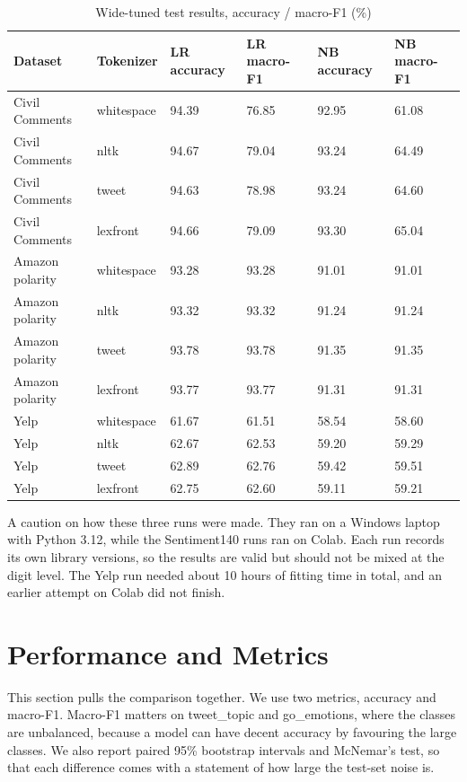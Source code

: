\documentclass[journal,a4paper]{IEEEtran}
\begin{document}
\begin{table}[!tb]
\caption{Wide-tuned test results, accuracy / macro-F1 (\%)}\label{tab:12}
\centering
\scriptsize
\setlength{\tabcolsep}{3pt}
\begin{tabular}{llllll}
\toprule
\textbf{Dataset} & \textbf{Tokenizer} & \textbf{LR accuracy} & \textbf{LR macro-F1} & \textbf{NB accuracy} & \textbf{NB macro-F1} \\
\midrule
Civil Comments & whitespace & 94.39 & 76.85 & 92.95 & 61.08 \\
Civil Comments & nltk & 94.67 & 79.04 & 93.24 & 64.49 \\
Civil Comments & tweet & 94.63 & 78.98 & 93.24 & 64.60 \\
Civil Comments & lexfront & 94.66 & 79.09 & 93.30 & 65.04 \\
Amazon polarity & whitespace & 93.28 & 93.28 & 91.01 & 91.01 \\
Amazon polarity & nltk & 93.32 & 93.32 & 91.24 & 91.24 \\
Amazon polarity & tweet & 93.78 & 93.78 & 91.35 & 91.35 \\
Amazon polarity & lexfront & 93.77 & 93.77 & 91.31 & 91.31 \\
Yelp & whitespace & 61.67 & 61.51 & 58.54 & 58.60 \\
Yelp & nltk & 62.67 & 62.53 & 59.20 & 59.29 \\
Yelp & tweet & 62.89 & 62.76 & 59.42 & 59.51 \\
Yelp & lexfront & 62.75 & 62.60 & 59.11 & 59.21 \\
\bottomrule
\end{tabular}
\end{table}

A caution on how these three runs were made. They ran on a Windows laptop with Python 3.12, while the Sentiment140 runs ran on Colab. Each run records its own library versions, so the results are valid but should not be mixed at the digit level. The Yelp run needed about 10 hours of fitting time in total, and an earlier attempt on Colab did not finish.

\section{Performance and Metrics}\label{sec:5}
This section pulls the comparison together. We use two metrics, accuracy and macro-F1. Macro-F1 matters on tweet\_topic and go\_emotions, where the classes are unbalanced, because a model can have decent accuracy by favouring the large classes. We also report paired 95\% bootstrap intervals and McNemar's test, so that each difference comes with a statement of how large the test-set noise is.
\end{document}
